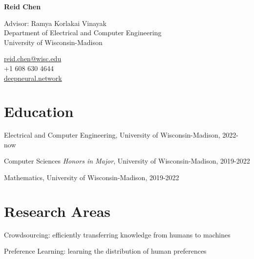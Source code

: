 \documentclass[11pt,letterpaper]{report}
\newcommand{\myname}{Reid Chen}
\newcommand{\namefont}[1]{{\normalfont\bfseries\Huge{#1}}}
\newcommand{\listitemspace}{0.25em}
\renewenvironment{itemize}
{\begin{list}{}{\setlength{\leftmargin}{0em}
                \setlength{\parskip}{0em}
                \setlength{\itemsep}{\listitemspace}
                \setlength{\parsep}{\listitemspace}}}
{\end{list}}
\begin{document}
    \raggedright{}

    \namefont{\myname}

    \vspace{1em}
    \begin{minipage}[t]{0.700\textwidth}
        Advisor: Ramya Korlakai Vinayak \\
        Department of Electrical and Computer Engineering \\
        University of Wisconsin-Madison
    \end{minipage}
    \begin{minipage}[t]{0.295\textwidth}
        \flushright{}
        \href{mailto:boeing@usc.edu}{reid.chen@wisc.edu} \\
        +1 608 630 4644 \\
        \href{https://www.deepneural.network/}{deepneural.network}
    \end{minipage}


    \section*{Education}

    \begin{tablist}

        \item[M.S.]  \tab{} Electrical and Computer Engineering, University of Wisconsin-Madison, 2022-now
        \item[B.A.]  \tab{} Computer Sciences \textit{Honors in Major}, University of Wisconsin-Madison, 2019-2022
        \item[B.A.]  \tab{} Mathematics, University of Wisconsin-Madison, 2019-2022

    \end{tablist}



    \section*{Research Areas}

    \begin{itemize}
        \item Crowdsourcing: efficiently transferring knowledge from humans to machines
        \item Preference Learning: learning the distribution of human preferences
    \end{itemize}
\end{document}
